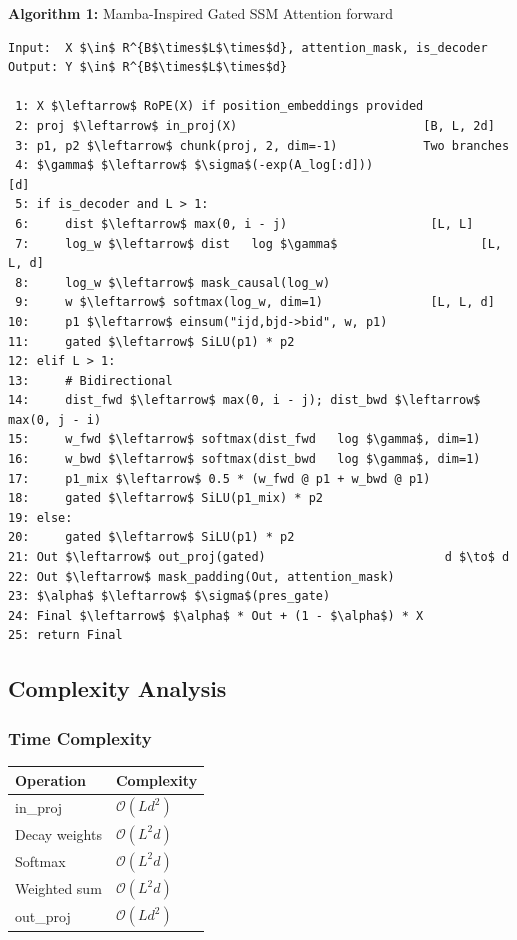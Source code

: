 \textbf{Algorithm 1:} Mamba-Inspired Gated SSM Attention forward
\begin{lstlisting}
Input:  X $\in$ R^{B$\times$L$\times$d}, attention_mask, is_decoder
Output: Y $\in$ R^{B$\times$L$\times$d}

 1: X $\leftarrow$ RoPE(X) if position_embeddings provided
 2: proj $\leftarrow$ in_proj(X)                          [B, L, 2d]
 3: p1, p2 $\leftarrow$ chunk(proj, 2, dim=-1)            Two branches
 4: $\gamma$ $\leftarrow$ $\sigma$(-exp(A_log[:d]))                      [d]
 5: if is_decoder and L > 1:
 6:     dist $\leftarrow$ max(0, i - j)                    [L, L]
 7:     log_w $\leftarrow$ dist   log $\gamma$                    [L, L, d]
 8:     log_w $\leftarrow$ mask_causal(log_w)
 9:     w $\leftarrow$ softmax(log_w, dim=1)               [L, L, d]
10:     p1 $\leftarrow$ einsum("ijd,bjd->bid", w, p1)
11:     gated $\leftarrow$ SiLU(p1) * p2
12: elif L > 1:
13:     # Bidirectional
14:     dist_fwd $\leftarrow$ max(0, i - j); dist_bwd $\leftarrow$ max(0, j - i)
15:     w_fwd $\leftarrow$ softmax(dist_fwd   log $\gamma$, dim=1)
16:     w_bwd $\leftarrow$ softmax(dist_bwd   log $\gamma$, dim=1)
17:     p1_mix $\leftarrow$ 0.5 * (w_fwd @ p1 + w_bwd @ p1)
18:     gated $\leftarrow$ SiLU(p1_mix) * p2
19: else:
20:     gated $\leftarrow$ SiLU(p1) * p2
21: Out $\leftarrow$ out_proj(gated)                         d $\to$ d
22: Out $\leftarrow$ mask_padding(Out, attention_mask)
23: $\alpha$ $\leftarrow$ $\sigma$(pres_gate)
24: Final $\leftarrow$ $\alpha$ * Out + (1 - $\alpha$) * X
25: return Final
\end{lstlisting}

\subsection{Complexity Analysis}

\subsubsection{Time Complexity}

\begin{table}[H]
\centering
\small
\begin{tabular}{ll}
\toprule
\textbf{Operation} & \textbf{Complexity} \\
\midrule
in\_proj & $\mathcal{O}(L d^2)$ \\
Decay weights & $\mathcal{O}(L^2 d)$ \\
Softmax & $\mathcal{O}(L^2 d)$ \\
Weighted sum & $\mathcal{O}(L^2 d)$ \\
out\_proj & $\mathcal{O}(L d^2)$ \\
\bottomrule
\end{tabular}
\end{table}

